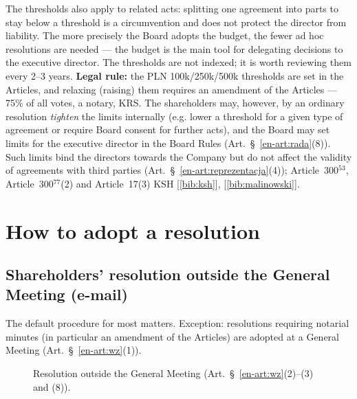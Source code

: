 \documentclass[11pt,a4paper]{report}
\newcommand{\Zr}[1]{[\ref{bib:#1}]}
\begin{document}
\begin{Komentarz}
The thresholds also apply to related acts: splitting one agreement into parts to stay below a threshold is a circumvention and does not protect the director from liability. The more precisely the Board adopts the budget, the fewer ad hoc resolutions are needed --- the budget is the main tool for delegating decisions to the executive director. The thresholds are not indexed; it is worth reviewing them every 2--3 years. \textbf{Legal rule:} the PLN 100k/250k/500k thresholds are set in the Articles, and relaxing (raising) them requires an amendment of the Articles --- 75\% of all votes, a notary, KRS. The shareholders may, however, by an ordinary resolution \emph{tighten} the limits internally (e.g. lower a threshold for a given type of agreement or require Board consent for further acts), and the Board may set limits for the executive director in the Board Rules (Art.~\S~\ref{en-art:rada}(8)). Such limits bind the directors towards the Company but do not affect the validity of agreements with third parties (Art.~\S~\ref{en-art:reprezentacja}(4)); Article~300$^{53}$, Article~300$^{77}$(2) and Article~17(3) KSH \Zr{ksh}, \Zr{malinowski}.
\end{Komentarz}

\section{How to adopt a resolution}

\subsection*{Shareholders' resolution outside the General Meeting (e-mail)}

The default procedure for most matters. Exception: resolutions requiring notarial minutes (in particular an amendment of the Articles) are adopted at a General Meeting (Art.~\S~\ref{en-art:wz}(1)).

\begin{figure}[H]
\centering
{}
\caption{Resolution outside the General Meeting (Art.~\S~\ref{en-art:wz}(2)--(3) and (8)).}
\end{figure}
\end{document}

